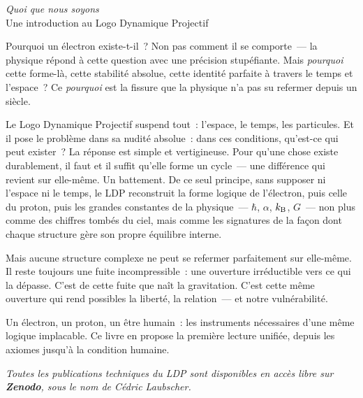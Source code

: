 \documentclass[12pt,a4paper]{article}
\begin{document}
\begin{center}
{\large\itshape Quoi que nous soyons}\\[0.3em]
{\small Une introduction au Logo Dynamique Projectif}
\end{center}

\bigskip

Pourquoi un électron existe-t-il~? Non pas comment il se comporte~--- la physique répond à cette question avec une précision stupéfiante. Mais \emph{pourquoi} cette forme-là, cette stabilité absolue, cette identité parfaite à travers le temps et l'espace~? Ce \emph{pourquoi} est la fissure que la physique n'a pas su refermer depuis un siècle.

Le Logo Dynamique Projectif suspend tout~: l'espace, le temps, les particules. Et il pose le problème dans sa nudité absolue~: dans ces conditions, qu'est-ce qui peut exister~? La réponse est simple et vertigineuse. Pour qu'une chose existe durablement, il faut et il suffit qu'elle forme un cycle~--- une différence qui revient sur elle-même. Un battement. De ce seul principe, sans supposer ni l'espace ni le temps, le LDP reconstruit la forme logique de l'électron, puis celle du proton, puis les grandes constantes de la physique~--- $\hbar$, $\alpha$, $k_{\rm B}$, $G$~--- non plus comme des chiffres tombés du ciel, mais comme les signatures de la façon dont chaque structure gère son propre équilibre interne.

Mais aucune structure complexe ne peut se refermer parfaitement sur elle-même. Il reste toujours une fuite incompressible~: une ouverture irréductible vers ce qui la dépasse. C'est de cette fuite que naît la gravitation. C'est cette même ouverture qui rend possibles la liberté, la relation~--- et notre vulnérabilité.

Un électron, un proton, un être humain~: les instruments nécessaires d'une même logique implacable. Ce livre en propose la première lecture unifiée, depuis les axiomes jusqu'à la condition humaine.

\bigskip

\begin{center}
{\small\itshape Toutes les publications techniques du LDP sont disponibles en accès libre sur \textbf{Zenodo}, sous le nom de Cédric Laubscher.}
\end{center}
\end{document}
